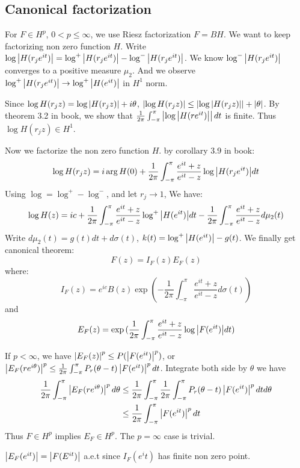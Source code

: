 \subsection{Canonical factorization}
For $F\in H^p$, $0<p\leq\infty$, we use Riesz factorization $F=BH$. We want to keep factorizing non zero function $H$. Write $\log{\left\lvert H(r_je^{it})\right\rvert}=\log^+{\left\lvert H(r_je^{it})\right\rvert}-\log^-{\left\lvert H(r_je^{it})\right\rvert}$. We know $\log^-{\left\lvert H(r_je^{it})\right\rvert}$ converges to a positive measure $\mu_2$. And we observe $\log^+{\left\lvert H(r_je^{it})\right\rvert}\to \log^+{\left\lvert H(e^{it})\right\rvert}$ in $H^1$ norm. \par
Since $\log{H(r_jz)}=\log{\left\lvert H(r_jz)\right\rvert}+i\theta$,
$\left\lvert\log{H(r_jz)}\right\rvert\leq \left\lvert\log{\left\lvert H(r_jz)\right\rvert}\right\rvert+\left\lvert\theta\right\rvert$. By theorem 3.2 in book, we show that $\frac{1}{2\pi}\int_{-\pi}^{\pi}{\left\lvert\log{\left\lvert H(re^{it})\right\rvert}\right\rvert d t}$ is
finite. Thus $\log{H(r_jz)}\in H^1$.\par
Now we factorize the non zero function $H$. by corollary 3.9 in book:
\begin{equation*}
    \log{H(r_jz)}=i\arg{H(0)}+\frac{1}{2\pi}\int_{-\pi}^{\pi}{\frac{e^{it}+z}{e^{it}-z}\log{\left\lvert H(r_je^{it})\right\rvert}d t}
\end{equation*}
Using $\log=\log^+-\log^-$, and let $r_j\to 1$, We have:
\begin{equation*}
    \log{H(z)}=i c+\frac{1}{2\pi}\int_{-\pi}^{\pi}{\frac{e^{it}+z}{e^{it}-z}\log^+{\left\lvert H(e^{it})\right\rvert}d t}-\frac{1}{2\pi}\int_{-\pi}^{\pi}{\frac{e^{it}+z}{e^{it}-z}d\mu_2(t)}
\end{equation*}
Write $d\mu_2(t)=g(t)d t+d\sigma(t)$, $k(t)=\log^+{\left\lvert H(e^{it})\right\rvert}-g(t)$. We finally get canonical theorem:
\begin{equation*}
    F(z)=I_F(z)E_F(z)
\end{equation*}
where:
\begin{equation*}
    I_F(z)=e^{i c}B(z)\exp{(-\frac{1}{2\pi}\int_{-\pi}^{\pi}{\frac{e^{it}+z}{e^{it}-z}d\sigma(t)})}
\end{equation*}
and
\begin{equation*}
    E_F(z)=\exp{(\frac{1}{2\pi}\int_{-\pi}^{\pi}{\frac{e^{it}+z}{e^{it}-z}\log{\left\lvert F(e^{it})\right\rvert}d t})}
\end{equation*}
\begin{remark}\label{rmk: property of factorization}
    If $p<\infty$, we have $\left\lvert E_F(z)\right\rvert^p\leq P(\left\lvert F(e^{it})\right\rvert^p)$, or $\left\lvert E_F(re^{i\theta})\right\rvert^p\leq \frac{1}{2\pi}\int_{-\pi}^{\pi}P_r(\theta-t)\left\lvert F(e^{it})\right\rvert^p dt$.
    Integrate both side by $\theta$ we have
    \begin{align*}
        \frac{1}{2\pi}\int_{-\pi}^{\pi}\left\lvert E_F(re^{i\theta})\right\rvert^p d\theta & \leq \frac{1}{2\pi}\int_{-\pi}^{\pi}\frac{1}{2\pi}\int_{-\pi}^{\pi}P_r(\theta-t)\left\lvert F(e^{it})\right\rvert^p d t d\theta \\
                                                                         & \leq\frac{1}{2\pi}\int_{-\pi}^{\pi}\left\lvert F(e^{it})\right\rvert^p d t
    \end{align*}
    Thus $F\in H^p$ implies $E_F\in H^p$. The $p=\infty$ case is trivial. \par
    $\left\lvert E_F(e^{it})\right\rvert=\left\lvert F(E^{it})\right\rvert$ a.e.t since $I_F(e^it)$ has finite non zero point.
\end{remark}
